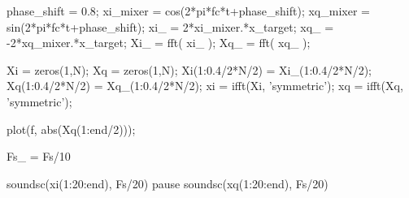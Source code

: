 \documentclass[10pt,twocolumn,a4paper]{article}
\begin{document}
\begin{spverbatim}
%
%
phase_shift = 0.8;
xi_mixer = cos(2*pi*fc*t+phase_shift);
xq_mixer = sin(2*pi*fc*t+phase_shift);
xi_ = 2*xi_mixer.*x_target;
xq_ = -2*xq_mixer.*x_target;
Xi_ = fft( xi_ );
Xq_ = fft( xq_ );

Xi = zeros(1,N);
Xq = zeros(1,N);
Xi(1:0.4/2*N/2) = Xi_(1:0.4/2*N/2);
Xq(1:0.4/2*N/2) = Xq_(1:0.4/2*N/2);
xi = ifft(Xi, 'symmetric');
xq = ifft(Xq, 'symmetric');

plot(f, abs(Xq(1:end/2)));

Fs_ = Fs/10

soundsc(xi(1:20:end), Fs/20)
pause
soundsc(xq(1:20:end), Fs/20)  

\end{spverbatim}
\end{document}
